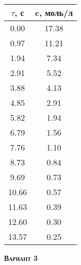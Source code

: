 \begin{table}[h]
\begin{tabular}{|c|c|}
\hline
$\tau$, с & c, моль/л \\ \hline
 0.00 &      17.38 \\ \hline 
 0.97 &      11.21 \\ \hline 
 1.94 &       7.34 \\ \hline 
 2.91 &       5.52 \\ \hline 
 3.88 &       4.13 \\ \hline 
 4.85 &       2.91 \\ \hline 
 5.82 &       1.94 \\ \hline 
 6.79 &       1.56 \\ \hline 
 7.76 &       1.10 \\ \hline 
 8.73 &       0.84 \\ \hline 
 9.69 &       0.73 \\ \hline 
10.66 &       0.57 \\ \hline 
11.63 &       0.39 \\ \hline 
12.60 &       0.30 \\ \hline 
13.57 &       0.25 \\ \hline 
\end{tabular}
\end{table}

\newpage

\textsc{\textbf{Вариант 3}}

